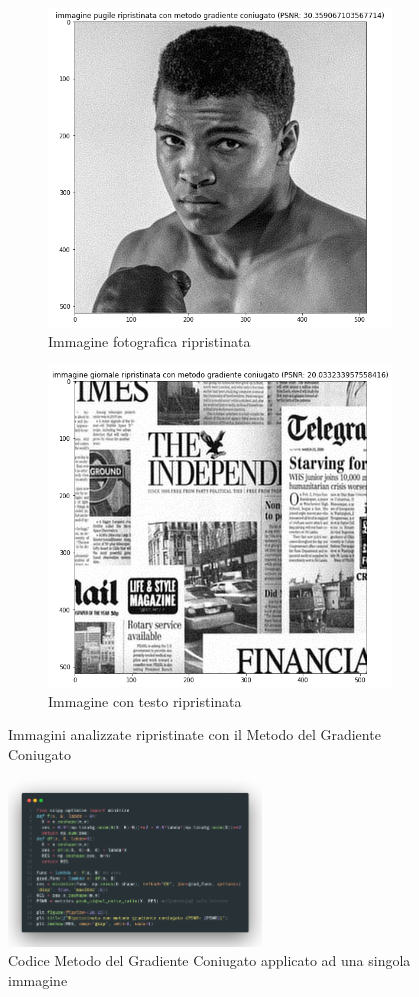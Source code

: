 \begin{figure}[H]
  \begin{subfigure}{0.5\textwidth}
    \centering
    \includegraphics[width=0.6\linewidth]{imgRel/pugilemgc.png}
    \caption{Immagine fotografica ripristinata}
    \label{fig:pugilemgc}
  \end{subfigure}\hfill
  \begin{subfigure}{0.5\textwidth}
    \centering
    \includegraphics[width=0.6\linewidth]{imgRel/giornalemgc.png}
    \caption{Immagine con testo ripristinata}
  \end{subfigure}
  \caption{Immagini analizzate ripristinate con il Metodo del Gradiente Coniugato}

  \centering
    \includegraphics[width=0.6\textwidth]{imgCode/metGradCon.png}
    \caption{Codice Metodo del Gradiente Coniugato applicato ad una singola immagine}
    \label{fig:codeMGC}
\end{figure}

